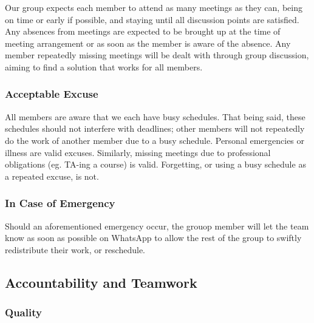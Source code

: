 \documentclass{article}
\begin{document}
Our group expects each member to attend as many meetings as they can, being on time 
or early if possible, and staying until all discussion points are satisfied. Any 
absences from meetings are expected to be brought up at the time of meeting arrangement 
or as soon as the member is aware of the absence. Any member repeatedly missing meetings 
will be dealt with through group discussion, aiming to find a solution that works for all members.

\subsubsection*{Acceptable Excuse}

\iffalse
\wss{What constitutes an acceptable excuse for missing a meeting or a deadline?
What types of excuses will not be considered acceptable?}
\fi

All members are aware that we each have busy schedules. That being said, these 
schedules should not interfere with deadlines; other members will not repeatedly 
do the work of another member due to a busy schedule. Personal emergencies or illness 
are valid excuses. Similarly, missing meetings due to professional obligations (eg. 
TA-ing a course) is valid. Forgetting, or using a busy schedule as a repeated excuse, is not.

\subsubsection*{In Case of Emergency}

\iffalse
\wss{What process will team members follow if they have an emergency and cannot
attend a team meeting or complete their individual work promised for a team
deliverable?}
\fi

Should an aforementioned emergency occur, the grouop member will let the team know as 
soon as possible on WhatsApp to allow the rest of the group to swiftly redistribute 
their work, or reschedule.

\subsection*{Accountability and Teamwork}

\subsubsection*{Quality}

\iffalse
\wss{What are your team's expectations regarding the quality
of team members' preparation for team meetings and the quality of the
deliverables that members bring to the team?}
\fi
\end{document}
